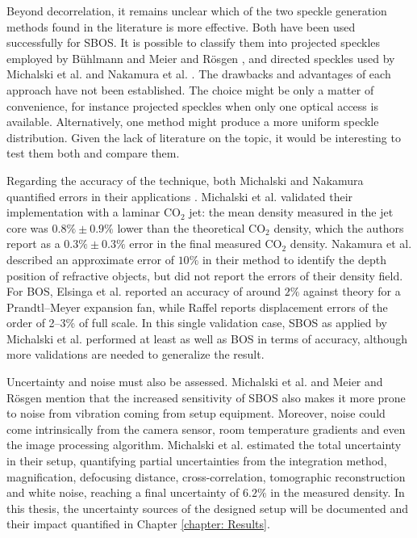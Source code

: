 \par Beyond decorrelation, it remains unclear which of the two speckle generation methods found in the literature is more effective. Both have been used successfully for SBOS. It is possible to classify them into projected speckles employed by Bühlmann \cite{Buhlmann2020} and Meier and Rösgen \cite{Meier&Roesgen2013}, and directed speckles used by Michalski et al. \cite{Michalski2018} and Nakamura et al. \cite{Nakamura2021}. The drawbacks and advantages of each approach have not been established. The choice might be only a matter of convenience, for instance projected speckles when only one optical access is available. Alternatively, one method might produce a more uniform speckle distribution. Given the lack of literature on the topic, it would be interesting to test them both and compare them.

\par Regarding the accuracy of the technique, both Michalski and Nakamura quantified errors in their applications \cite{Michalski2018, Nakamura2021}. Michalski et al. validated their implementation with a laminar CO$_2$ jet: the mean density measured in the jet core was $0.8\% \pm 0.9\%$ lower than the theoretical CO$_2$ density, which the authors report as a $0.3\% \pm 0.3\%$ error in the final measured CO$_2$ density. Nakamura et al. described an approximate error of $10\%$ in their method to identify the depth position of refractive objects, but did not report the errors of their density field. For BOS, Elsinga et al. \cite{Elsinga2004} reported an accuracy of around $2\%$ against theory for a Prandtl--Meyer expansion fan, while Raffel \cite{Raffel2015} reports displacement errors of the order of 2--3\% of full scale. In this single validation case, SBOS as applied by Michalski et al. performed at least as well as BOS in terms of accuracy, although more validations are needed to generalize the result.

\par Uncertainty and noise must also be assessed. Michalski et al. \cite{Michalski2018} and Meier and Rösgen \cite{Meier&Roesgen2013} mention that the increased sensitivity of SBOS also makes it more prone to noise from vibration coming from setup equipment. Moreover, noise could come intrinsically from the camera sensor, room temperature gradients and even the image processing algorithm. Michalski et al. estimated the total uncertainty in their setup, quantifying partial uncertainties from the integration method, magnification, defocusing distance, cross-correlation, tomographic reconstruction and white noise, reaching a final uncertainty of $6.2\%$ in the measured density. In this thesis, the uncertainty sources of the designed setup will be documented and their impact quantified in Chapter \ref{chapter: Results}.

